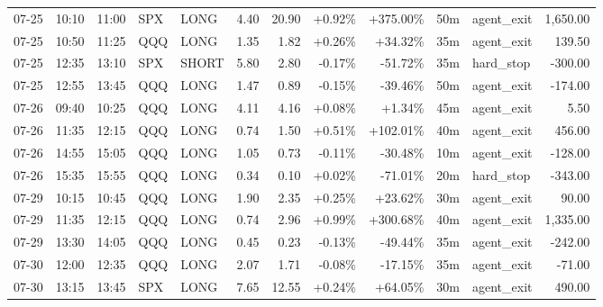 \documentclass[11pt,a4paper,twoside]{article}
\begin{document}
\begin{center}
\begin{longtable}{>{\color{txtmain}}l l l l l r r r r r >{\color{txtmain}}l r}
07-25 & 10:10 & 11:00 & SPX & LONG & 4.40 & 20.90 & \textcolor{wingreen}{+0.92\%} & \textcolor{wingreen}{+375.00\%} & 50m & agent\_exit & \textcolor{wingreen}{1,650.00} \\
07-25 & 10:50 & 11:25 & QQQ & LONG & 1.35 & 1.82 & \textcolor{wingreen}{+0.26\%} & \textcolor{wingreen}{+34.32\%} & 35m & agent\_exit & \textcolor{wingreen}{139.50} \\
07-25 & 12:35 & 13:10 & SPX & SHORT & 5.80 & 2.80 & \textcolor{lossred}{-0.17\%} & \textcolor{lossred}{-51.72\%} & 35m & hard\_stop & \textcolor{lossred}{-300.00} \\
07-25 & 12:55 & 13:45 & QQQ & LONG & 1.47 & 0.89 & \textcolor{lossred}{-0.15\%} & \textcolor{lossred}{-39.46\%} & 50m & agent\_exit & \textcolor{lossred}{-174.00} \\
07-26 & 09:40 & 10:25 & QQQ & LONG & 4.11 & 4.16 & \textcolor{wingreen}{+0.08\%} & \textcolor{wingreen}{+1.34\%} & 45m & agent\_exit & \textcolor{wingreen}{5.50} \\
07-26 & 11:35 & 12:15 & QQQ & LONG & 0.74 & 1.50 & \textcolor{wingreen}{+0.51\%} & \textcolor{wingreen}{+102.01\%} & 40m & agent\_exit & \textcolor{wingreen}{456.00} \\
07-26 & 14:55 & 15:05 & QQQ & LONG & 1.05 & 0.73 & \textcolor{lossred}{-0.11\%} & \textcolor{lossred}{-30.48\%} & 10m & agent\_exit & \textcolor{lossred}{-128.00} \\
07-26 & 15:35 & 15:55 & QQQ & LONG & 0.34 & 0.10 & \textcolor{wingreen}{+0.02\%} & \textcolor{lossred}{-71.01\%} & 20m & hard\_stop & \textcolor{lossred}{-343.00} \\
07-29 & 10:15 & 10:45 & QQQ & LONG & 1.90 & 2.35 & \textcolor{wingreen}{+0.25\%} & \textcolor{wingreen}{+23.62\%} & 30m & agent\_exit & \textcolor{wingreen}{90.00} \\
07-29 & 11:35 & 12:15 & QQQ & LONG & 0.74 & 2.96 & \textcolor{wingreen}{+0.99\%} & \textcolor{wingreen}{+300.68\%} & 40m & agent\_exit & \textcolor{wingreen}{1,335.00} \\
07-29 & 13:30 & 14:05 & QQQ & LONG & 0.45 & 0.23 & \textcolor{lossred}{-0.13\%} & \textcolor{lossred}{-49.44\%} & 35m & agent\_exit & \textcolor{lossred}{-242.00} \\
07-30 & 12:00 & 12:35 & QQQ & LONG & 2.07 & 1.71 & \textcolor{lossred}{-0.08\%} & \textcolor{lossred}{-17.15\%} & 35m & agent\_exit & \textcolor{lossred}{-71.00} \\
07-30 & 13:15 & 13:45 & SPX & LONG & 7.65 & 12.55 & \textcolor{wingreen}{+0.24\%} & \textcolor{wingreen}{+64.05\%} & 30m & agent\_exit & \textcolor{wingreen}{490.00} \\

\end{longtable}
\end{center}
\end{document}

